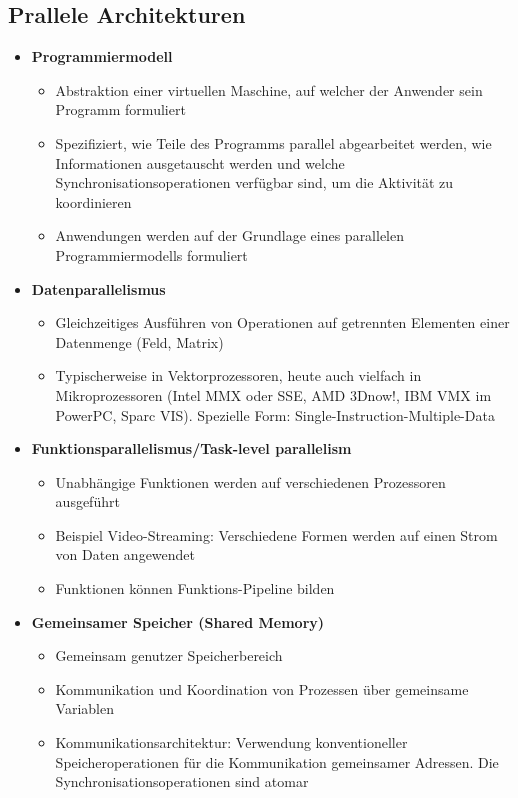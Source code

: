 \subsection{Prallele Architekturen}
\begin{itemize}
	\item \textbf{Programmiermodell}
	\begin{itemize}
		\item Abstraktion einer virtuellen Maschine, auf welcher der Anwender sein Programm formuliert
		\item Spezifiziert, wie Teile des Programms parallel abgearbeitet werden, wie Informationen ausgetauscht werden und welche Synchronisationsoperationen verfügbar sind, um die Aktivität zu koordinieren
		\item Anwendungen werden auf der Grundlage eines parallelen Programmiermodells formuliert
	\end{itemize}
	\item \textbf{Datenparallelismus}
	\begin{itemize}
		\item Gleichzeitiges Ausführen von Operationen auf getrennten Elementen einer Datenmenge (Feld, Matrix)
		\item Typischerweise in Vektorprozessoren, heute auch vielfach in Mikroprozessoren (Intel MMX oder SSE, AMD 3Dnow!, IBM VMX im PowerPC, Sparc VIS). Spezielle Form: Single-Instruction-Multiple-Data
	\end{itemize}
	\item \textbf{Funktionsparallelismus/Task-level parallelism}
	\begin{itemize}
		\item Unabhängige Funktionen werden auf verschiedenen Prozessoren ausgeführt
		\item Beispiel Video-Streaming: Verschiedene Formen werden auf einen Strom von Daten angewendet
		\item Funktionen können Funktions-Pipeline bilden
	\end{itemize}
	\item \textbf{Gemeinsamer Speicher (Shared Memory)}
	\begin{itemize}
		\item Gemeinsam genutzer Speicherbereich
		\item Kommunikation und Koordination von Prozessen über gemeinsame Variablen
		\item Kommunikationsarchitektur: Verwendung konventioneller Speicheroperationen für die Kommunikation gemeinsamer Adressen. Die Synchronisationsoperationen sind atomar

\end{itemize}
\end{itemize}
